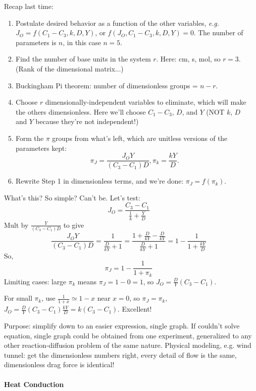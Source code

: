 \documentclass{report}
\begin{document}
Recap last time:
\begin{enumerate}
\item Postulate desired behavior as a function of the other variables, {\em
    e.g.} $J_O = f(C_1-C_3, k, D, Y)$, or $f (J_O, C_1-C_3, k, D, Y) = 0$.  The
  number of parameters is $n$, in this case $n=5$.

\item Find the number of base units in the system $r$.  Here: cm, s, mol, so
  $r=3$.  (Rank of the dimensional matrix...)

\item Buckingham Pi theorem: number of dimensionless groups = $n-r$.

\item Choose $r$ dimensionally-independent variables to eliminate, which will
  make the others dimensionless.  Here we'll choose $C_1-C_3$, $D$, and $Y$
  (NOT $k$, $D$ and $Y$ because they're not independent!)

\item Form the $\pi$ groups from what's left, which are unitless versions of
  the parameters kept:
  $$\pi_J = \frac{J_O Y}{(C_3-C_1) D}, \pi_k = \frac{kY}{D}.$$
\item Rewrite Step 1 in dimensionless terms, and we're done: $\pi_J =
  f(\pi_k).$
\end{enumerate}
What's this?  So simple?  Can't be.  Let's test:
$$J_O=\frac{C_3-C_1}{\frac{1}{k} + \frac{Y}{D}}$$
Mult by $\frac{Y}{(C_3-C_1)D}$ to give
$$\frac{J_O Y}{(C_3-C_1)D} = \frac{1}{\frac{D}{kY} + 1} =
\frac{1 + \frac{D}{kY} - \frac{D}{kY}}{\frac{D}{kY} + 1} =
1 - \frac{1}{1+\frac{kY}{D}}$$
So,
$$\pi_J = 1 - \frac{1}{1+\pi_k}$$
Limiting cases: large $\pi_k$ means $\pi_J = 1-0 = 1$, so $J_O =
\frac{D}{Y}(C_3-C_1)$.

For small $\pi_k$, use $\frac{1}{1+x}\simeq1-x$ near $x=0$, so $\pi_J = \pi_k$,
$J_O = \frac{D}{Y}(C_3-C_1)\frac{kY}{D} = k(C_3-C_1)$.  Excellent!

Purpose: simplify down to an easier expression, single graph.  If couldn't
solve equation, single graph could be obtained from one experiment, generalized
to any other reaction-diffusion problem of the same nature.  Physical modeling,
e.g. wind tunnel: get the dimensionless numbers right, every detail of flow is
the same, dimensionless drag force is identical!

\paragraph{Heat Conduction}
\end{document}

